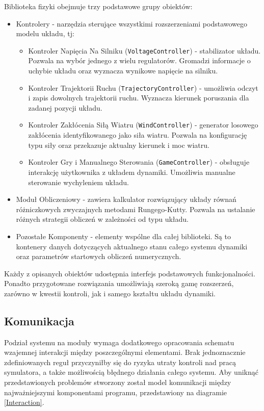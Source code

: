 \documentclass[12pt, oneside]{report}
\theoremstyle{definition}
\begin{document}
Biblioteka fizyki obejmuje trzy podstawowe grupy obiektów:
\begin{itemize}
\item Kontrolery - narzędzia sterujące wszystkimi rozszerzeniami podstawowego modelu układu, tj:
\begin{itemize}
\item Kontroler Napięcia Na Silniku (\texttt{VoltageController}) - stabilizator układu. Pozwala na wybór jednego z wielu regulatorów. Gromadzi informacje o uchybie układu oraz wyznacza wynikowe napięcie na silniku.
\item Kontroler Trajektorii Ruchu (\texttt{TrajectoryController}) - umożliwia odczyt i zapis dowolnych trajektorii ruchu. Wyznacza kierunek poruszania dla zadanej pozycji układu.
\item Kontroler Zakłócenia Siłą Wiatru (\texttt{WindController}) - generator losowego zakłócenia identyfikowanego jako siła wiatru. Pozwala na konfigurację typu siły oraz przekazuje aktualny kierunek i moc wiatru.
\item Kontroler Gry i Manualnego Sterowania (\texttt{GameController}) - obsługuje interakcję użytkownika z układem dynamiki. Umożliwia manualne sterowanie wychyleniem układu.
\end{itemize}
\item Moduł Obliczeniowy - zawiera kalkulator rozwiązujący układy równań różniczkowych zwyczajnych metodami Rungego-Kutty. Pozwala na ustalanie różnych strategii obliczeń w zależności od typu układu.
\item Pozostałe Komponenty - elementy wspólne dla całej biblioteki. Są to kontenery danych dotyczących aktualnego stanu całego systemu dynamiki oraz parametrów startowych obliczeń numerycznych. 
\end{itemize}

Każdy z opisanych obiektów udostępnia interfejs podstawowych funkcjonalności. Ponadto przygotowane rozwiązania umożliwiają szeroką gamę rozszerzeń, zarówno w kwestii kontroli, jak i samego kształtu układu dynamiki.

\subsection{Komunikacja}
Podział systemu na moduły wymaga dodatkowego opracowania schematu wzajemnej interakcji między poszczególnymi elementami. Brak jednoznacznie zdefiniowanych reguł przyczyniłby się do ryzyka utraty kontroli nad pracą symulatora, a także możliwością błędnego działania całego systemu. Aby uniknąć przedstawionych problemów stworzony został model komunikacji między najważniejszymi komponentami programu, przedstawiony na diagramie \ref{Interaction}.
\end{document}

